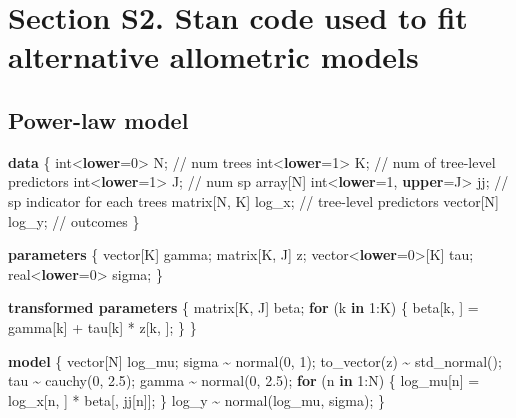 \documentclass[
  12pt,
  letterpaper,
  DIV=11,
  numbers=noendperiod]{scrartcl}
\newenvironment{Shaded}{\begin{snugshade}}{\end{snugshade}}
\newcommand{\CommentTok}[1]{\textcolor[rgb]{0.37,0.37,0.37}{#1}}
\newcommand{\ControlFlowTok}[1]{\textcolor[rgb]{0.00,0.23,0.31}{\textbf{#1}}}
\newcommand{\DataTypeTok}[1]{\textcolor[rgb]{0.68,0.00,0.00}{#1}}
\newcommand{\DecValTok}[1]{\textcolor[rgb]{0.68,0.00,0.00}{#1}}
\newcommand{\FloatTok}[1]{\textcolor[rgb]{0.68,0.00,0.00}{#1}}
\newcommand{\KeywordTok}[1]{\textcolor[rgb]{0.00,0.23,0.31}{\textbf{#1}}}
\newcommand{\NormalTok}[1]{\textcolor[rgb]{0.00,0.23,0.31}{#1}}
\begin{document}
\section{Section S2. Stan code used to fit alternative allometric
models}\label{section-s2.-stan-code-used-to-fit-alternative-allometric-models-1}

\subsection{Power-law model}\label{power-law-model}

\begin{Shaded}
\begin{Highlighting}[]
\KeywordTok{data}\NormalTok{ \{}
  \DataTypeTok{int}\NormalTok{\textless{}}\KeywordTok{lower}\NormalTok{=}\DecValTok{0}\NormalTok{\textgreater{} N;                    }\CommentTok{// num trees}
  \DataTypeTok{int}\NormalTok{\textless{}}\KeywordTok{lower}\NormalTok{=}\DecValTok{1}\NormalTok{\textgreater{} K;                    }\CommentTok{// num of tree{-}level predictors}
  \DataTypeTok{int}\NormalTok{\textless{}}\KeywordTok{lower}\NormalTok{=}\DecValTok{1}\NormalTok{\textgreater{} J;                    }\CommentTok{// num sp}
  \DataTypeTok{array}\NormalTok{[N] }\DataTypeTok{int}\NormalTok{\textless{}}\KeywordTok{lower}\NormalTok{=}\DecValTok{1}\NormalTok{, }\KeywordTok{upper}\NormalTok{=J\textgreater{} jj; }\CommentTok{// sp indicator for each trees}
  \DataTypeTok{matrix}\NormalTok{[N, K] log\_x;                }\CommentTok{// tree{-}level predictors}
  \DataTypeTok{vector}\NormalTok{[N] log\_y;                   }\CommentTok{// outcomes}
\NormalTok{\}}

\KeywordTok{parameters}\NormalTok{ \{}
  \DataTypeTok{vector}\NormalTok{[K] gamma;}
  \DataTypeTok{matrix}\NormalTok{[K, J] z;}
  \DataTypeTok{vector}\NormalTok{\textless{}}\KeywordTok{lower}\NormalTok{=}\DecValTok{0}\NormalTok{\textgreater{}[K] tau;}
  \DataTypeTok{real}\NormalTok{\textless{}}\KeywordTok{lower}\NormalTok{=}\DecValTok{0}\NormalTok{\textgreater{} sigma;}
\NormalTok{\}}

\KeywordTok{transformed parameters}\NormalTok{ \{}
  \DataTypeTok{matrix}\NormalTok{[K, J] beta;}
  \ControlFlowTok{for}\NormalTok{ (k }\ControlFlowTok{in} \DecValTok{1}\NormalTok{:K) \{}
\NormalTok{    beta[k, ] = gamma[k] + tau[k] * z[k, ];}
\NormalTok{  \}}
\NormalTok{\}}

\KeywordTok{model}\NormalTok{ \{}
  \DataTypeTok{vector}\NormalTok{[N] log\_mu;}
\NormalTok{  sigma \textasciitilde{} normal(}\DecValTok{0}\NormalTok{, }\DecValTok{1}\NormalTok{);}
\NormalTok{  to\_vector(z) \textasciitilde{} std\_normal();}
\NormalTok{  tau \textasciitilde{} cauchy(}\DecValTok{0}\NormalTok{, }\FloatTok{2.5}\NormalTok{);}
\NormalTok{  gamma \textasciitilde{} normal(}\DecValTok{0}\NormalTok{, }\FloatTok{2.5}\NormalTok{);}
  \ControlFlowTok{for}\NormalTok{ (n }\ControlFlowTok{in} \DecValTok{1}\NormalTok{:N) \{}
\NormalTok{    log\_mu[n] = log\_x[n, ] * beta[, jj[n]];}
\NormalTok{  \}}
\NormalTok{  log\_y \textasciitilde{} normal(log\_mu, sigma);}
\NormalTok{\}}


\end{Highlighting}
\end{Shaded}
\end{document}

